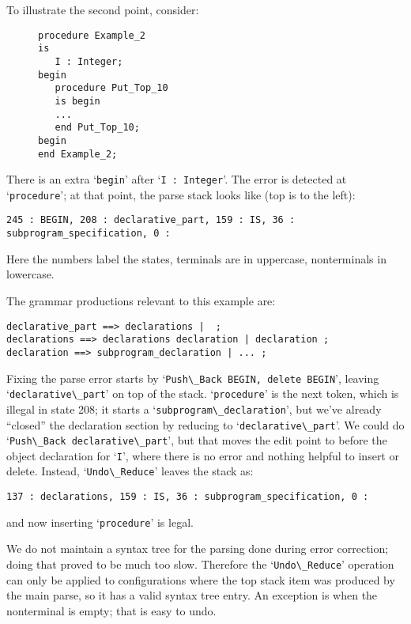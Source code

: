 \documentclass[authordraft]{acmart}
\newcommand{\code}[1]{`\lstinline|#1|'}
\begin{document}
To illustrate the second point, consider:
\begin{figure}[H]
\begin{lstlisting}
procedure Example_2
is
   I : Integer;
begin
   procedure Put_Top_10
   is begin
   ...
   end Put_Top_10;
begin
end Example_2;
\end{lstlisting}
\caption{}
\label{ex:extra_begin_2}
\end{figure}
There is an extra \code{begin} after
\code{I : Integer}. The error is detected at \code{procedure}; at that point,
the parse stack looks like (top is to the left):
\begin{verbatim}
245 : BEGIN, 208 : declarative_part, 159 : IS, 36 : subprogram_specification, 0 :
\end{verbatim}

Here the numbers label the states, terminals are in uppercase,
nonterminals in lowercase.

The grammar productions relevant to this example are:
\begin{verbatim}
declarative_part ==> declarations |  ;
declarations ==> declarations declaration | declaration ;
declaration ==> subprogram_declaration | ... ;
\end{verbatim}

Fixing the parse error starts by \code{Push\_Back BEGIN, delete BEGIN},
leaving \code{declarative\_part} on top of the stack. \code{procedure}
is the next token, which is illegal in state 208; it starts a
\code{subprogram\_declaration}, but we've already ``closed'' the
declaration section by reducing to \code{declarative\_part}. We could
do \code{Push\_Back declarative\_part}, but that moves the edit point to
before the object declaration for \code{I}, where there is no error
and nothing helpful to insert or delete. Instead, \code{Undo\_Reduce}
leaves the stack as:

\begin{verbatim}
137 : declarations, 159 : IS, 36 : subprogram_specification, 0 :
\end{verbatim}
and now inserting \code{procedure} is legal.

We do not maintain a syntax tree for the parsing done during error
correction; doing that proved to be much too slow. Therefore the
\code{Undo\_Reduce} operation can only be applied to configurations
where the top stack item was produced by the main parse, so it has a
valid syntax tree entry. An exception is when the nonterminal is
empty; that is easy to undo.
\end{document}
